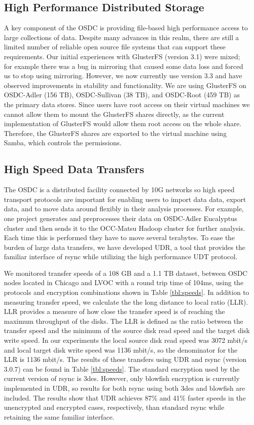 \documentclass[11pt,twocolumn]{article}
\begin{document}
\subsection{High Performance Distributed Storage}
\label{sec:storage}
A key component of the OSDC is providing file-based high performance
access to large collections of data. Despite many advances in this
realm, there are still a limited number of reliable open source file
systems that can support these requirements. Our initial experiences
with GlusterFS (version 3.1) were mixed; for example there was a bug
in mirroring that caused some data loss and forced us to stop using
mirroring. However, we now currently use version 3.3 and have observed
improvements in stability and functionality. We are using GlusterFS on
OSDC-Adler (156 TB), OSDC-Sullivan (38 TB), and OSDC-Root (459 TB) as
the primary data stores. Since
users have root access on their virtual machines we cannot allow them
to mount the GlusterFS shares directly, as the current implementation
of GlusterFS would allow them root access on the whole share. Therefore,
the GlusterFS shares are exported to the virtual machine using Samba,
which controls the permissions.

\subsection{High Speed Data Transfers}
The OSDC is a distributed facility connected by 10G networks so high
speed transport protocols are important for enabling users to import
data data, export data, and to move
data around flexibly in their analysis
processes. For example, one project generates and preprocesses their
data on OSDC-Adler Eucalyptus cluster and then sends it to the OCC-Matsu Hadoop cluster for
further analysis. Each time this is performed they have to move
several terabytes. To ease the burden of large data transfers, we have
developed UDR, a tool that provides the familiar interface of rsync
while utilizing the high performance UDT protocol.

We monitored transfer speeds of a 108 GB and a 1.1 TB dataset, between
OSDC nodes located in Chicago and LVOC with a round trip time of
104ms, using the protocols and encryption combinations shown in Table
\ref{tbl:speeds}. In addition
to measuring transfer speed, we calculate the the long distance to
local ratio (LLR). LLR provides a measure of how close the transfer
speed is of reaching the maximum throughput of the disks. The LLR is
defined as the ratio between the transfer speed and the minimum of the
source disk read speed and the target disk write speed. In our
experiments the local source disk read speed was 3072 mbit/s and local
target disk write speed was 1136 mbit/s, so the denominator for the
LLR is 1136 mbit/s. The results of these transfers using UDR and rsync (version 3.0.7) can be found in
Table \ref{tbl:speeds}. The standard encryption used by the current version of rsync is 3des. However, only blowfish encryption is currently implemented in UDR, so results for both rsync using both 3des and blowfish are included. The results show that UDR achieves 87\% and 41\% faster speeds in the unencrypted and encrypted cases, respectively, than standard rsync while retaining the same familiar interface.
\end{document}
